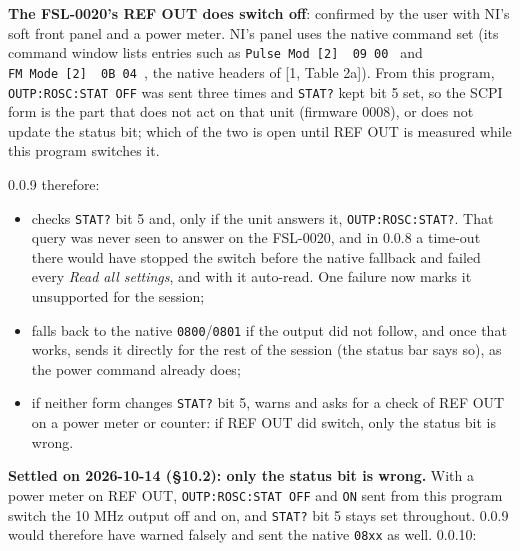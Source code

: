 \documentclass[
\directlua{luaotfload.add_fallback("qsfallback", {"DejaVu Sans:mode=harf;", "DejaVu Sans Mono:mode=harf;", "DejaVu Math TeX Gyre:mode=harf;"})}
  10pt,
  letterpaper,
]{article}
\providecommand{\tightlist}{%
  \setlength{\itemsep}{0pt}\setlength{\parskip}{0pt}}
\begin{document}
\textbf{The FSL-0020's REF OUT does switch off}: confirmed by the user
with NI's soft front panel and a power meter. NI's panel uses the native
command set (its command window lists entries such as
\texttt{Pulse\ Mod\ {[}2{]}\ \textbar{}\ 09\ 00\ \textbar{}} and
\texttt{FM\ Mode\ {[}2{]}\ \textbar{}\ 0B\ 04\ \textbar{}}, the native
headers of {[}1, Table 2a{]}). From this program,
\texttt{OUTP:ROSC:STAT\ OFF} was sent three times and \texttt{STAT?}
kept bit 5 set, so the SCPI form is the part that does not act on that
unit (firmware 0008), or does not update the status bit; which of the
two is open until REF OUT is measured while this program switches it.

0.0.9 therefore:

\begin{itemize}
\tightlist
\item
  checks \texttt{STAT?} bit 5 and, only if the unit answers it,
  \texttt{OUTP:ROSC:STAT?}. That query was never seen to answer on the
  FSL-0020, and in 0.0.8 a time-out there would have stopped the switch
  before the native fallback and failed every \emph{Read all settings},
  and with it auto-read. One failure now marks it unsupported for the
  session;
\item
  falls back to the native \texttt{0800}/\texttt{0801} if the output did
  not follow, and once that works, sends it directly for the rest of the
  session (the status bar says so), as the power command already does;
\item
  if neither form changes \texttt{STAT?} bit 5, warns and asks for a
  check of REF OUT on a power meter or counter: if REF OUT did switch,
  only the status bit is wrong.
\end{itemize}

\textbf{Settled on 2026-10-14 (§10.2): only the status bit is wrong.}
With a power meter on REF OUT, \texttt{OUTP:ROSC:STAT\ OFF} and
\texttt{ON} sent from this program switch the 10 MHz output off and on,
and \texttt{STAT?} bit 5 stays set throughout. 0.0.9 would therefore
have warned falsely and sent the native \texttt{08xx} as well. 0.0.10:
\end{document}
